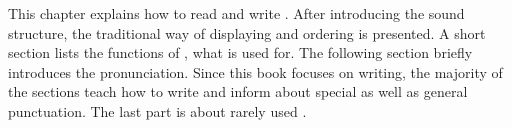 
%
%

This chapter explains how to read and write \jkanavoc. After introducing the
sound structure, the traditional way of displaying and ordering \jtopic{} is
presented. A short section lists the functions of \jtopic, what \jtopic{} is
used for. The following section briefly introduces the pronunciation. Since
this book focuses on writing, the majority of the sections teach how to write
\jtopic{} and inform about special \jtopic{} as well as general punctuation.
The last part is about rarely used \jtopic.

